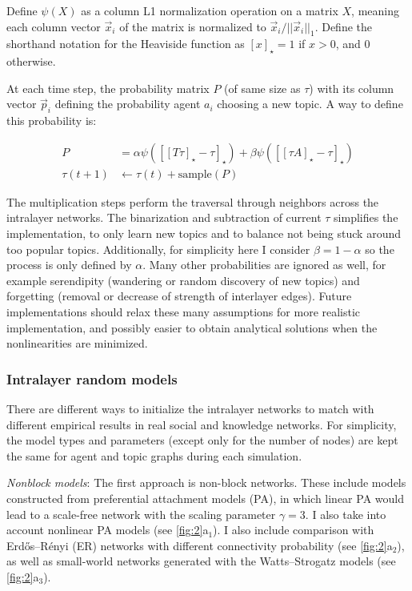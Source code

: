 Define $\psi(X)$ as a column L1 normalization operation on a matrix $X$, meaning each column vector $\vec{x}_i$ of the matrix is normalized to $\vec{x}_i/||\vec{x}_i||_1$. Define the shorthand notation for the Heaviside function as $[x]_{\star} = 1$ if $x > 0$, and $0$ otherwise.

At each time step, the probability matrix $P$ (of same size as $\tau$) with its column vector $\vec{p}_i$ defining the probability agent $a_i$ choosing a new topic. A way to define this probability is:

\begin{eqnarray}
    P &=
    \alpha \psi\left(\left[\left[T\tau\right]_{\star} - \tau \right]_{\star}\right) +
    \beta \psi\left(\left[\left[\tau A\right]_{\star} - \tau \right]_{\star}\right)
    \\
    \tau(t+1) &\leftarrow \tau(t) + \mathrm{sample}(P)
\end{eqnarray}

The multiplication steps perform the traversal through neighbors across the intralayer networks. The binarization and subtraction of current $\tau$ simplifies the implementation, to only learn new topics and to balance not being stuck around too popular topics. Additionally, for simplicity here I consider $\beta = 1 - \alpha$ so the process is only defined by $\alpha$. Many other probabilities are ignored as well, for example serendipity (wandering or random discovery of new topics) and forgetting (removal or decrease of strength of interlayer edges). Future implementations should relax these many assumptions for more realistic implementation, and possibly easier to obtain analytical solutions when the nonlinearities are minimized.



\subsubsection*{Intralayer random models}

There are different ways to initialize the intralayer networks to match with different empirical results in real social and knowledge networks. For simplicity, the model types and parameters (except only for the number of nodes) are kept the same for agent and topic graphs during each simulation.

\textit{Nonblock models}: The first approach is non-block networks. These include models constructed from preferential attachment models (PA), in which linear PA would lead to a scale-free network with the scaling parameter $\gamma = 3$. I also take into account nonlinear PA models (see \ref{fig:2}a$_1$). I also include comparison with Erdős–Rényi (ER) networks with different connectivity probability (see \ref{fig:2}a$_2$), as well as small-world networks generated with the Watts–Strogatz models (see \ref{fig:2}a$_3$).

